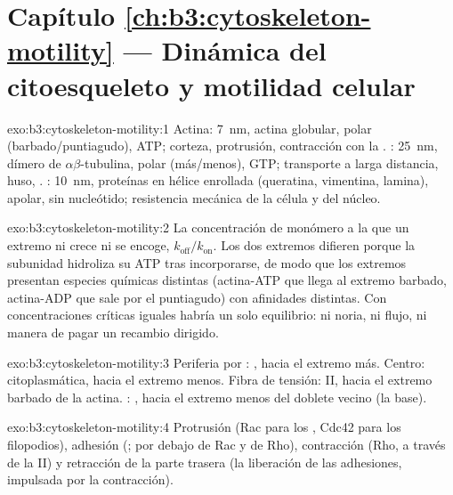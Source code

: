 \section*{Capítulo \ref{ch:b3:cytoskeleton-motility} --- Dinámica del citoesqueleto y motilidad celular}

\begin{solution}{exo:b3:cytoskeleton-motility:1}
Actina: \qty{7}{nm}, actina globular, polar (barbado/puntiagudo), ATP;
corteza, protrusión, contracción con la . :
\qty{25}{nm}, dímero de $\alpha\beta$-tubulina, polar (más/menos), GTP;
transporte a larga distancia, huso, . :
\qty{10}{nm}, proteínas en hélice enrollada (queratina, vimentina,
lamina), apolar, sin nucleótido; resistencia mecánica de la célula y del
núcleo.
\end{solution}

\begin{solution}{exo:b3:cytoskeleton-motility:2}
La concentración de monómero a la que un extremo ni crece ni se encoge,
$k_{\text{off}}/k_{\text{on}}$. Los dos extremos difieren porque la
subunidad hidroliza su ATP tras incorporarse, de modo que los extremos
presentan especies químicas distintas (actina-ATP que llega al extremo
barbado, actina-ADP que sale por el puntiagudo) con afinidades distintas.
Con concentraciones críticas iguales habría un solo equilibrio: ni noria,
ni flujo, ni manera de pagar un recambio dirigido.
\end{solution}

\begin{solution}{exo:b3:cytoskeleton-motility:3}
Periferia por : , hacia el extremo más. Centro:
 citoplasmática, hacia el extremo menos. Fibra de tensión: 
II, hacia el extremo barbado de la actina. : ,
hacia el extremo menos del doblete vecino (la base).
\end{solution}

\begin{solution}{exo:b3:cytoskeleton-motility:4}
Protrusión (Rac para los , Cdc42 para los filopodios),
adhesión (; por debajo de Rac y de Rho), contracción (Rho, a
través de la  II) y retracción de la parte trasera (la liberación
de las adhesiones, impulsada por la contracción).
\end{solution}

